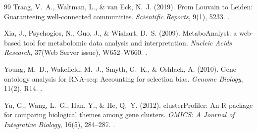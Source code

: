 \documentclass[11pt,oneside]{book}
\begin{document}
\begin{thebibliography}{99}
Traag, V.~A., Waltman, L., \& van Eck, N.~J. (2019). From Louvain to Leiden: Guaranteeing well-connected communities. \textit{Scientific Reports}, 9(1), 5233. .

Xia, J., Psychogios, N., Guo, J., \& Wishart, D.~S. (2009). MetaboAnalyst: a web-based tool for metabolomic data analysis and interpretation. \textit{Nucleic Acids Research}, 37(Web Server issue), W652--W660. .

Young, M.~D., Wakefield, M.~J., Smyth, G.~K., \& Oshlack, A. (2010). Gene ontology analysis for RNA-seq: Accounting for selection bias. \textit{Genome Biology}, 11(2), R14. .

Yu, G., Wang, L.~G., Han, Y., \& He, Q.~Y. (2012). clusterProfiler: An R package for comparing biological themes among gene clusters. \textit{OMICS: A Journal of Integrative Biology}, 16(5), 284--287. .

\end{thebibliography}
\end{document}
